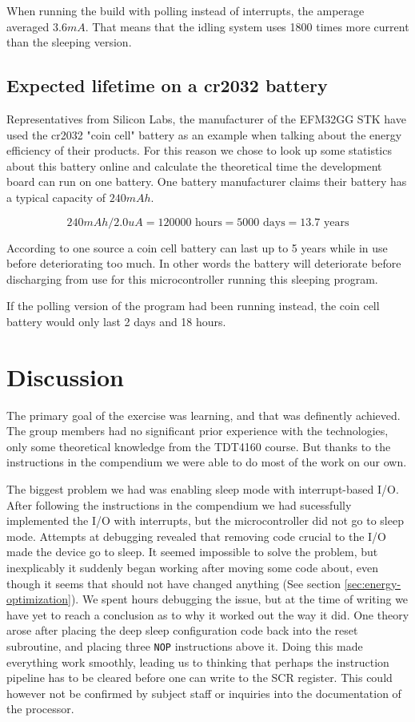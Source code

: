 When running the build with polling instead of interrupts, the amperage averaged $3.6 mA$. That means that the idling system uses 1800 times more current than the sleeping version.

\subsection{Expected lifetime on a cr2032 battery}

Representatives from Silicon Labs, the manufacturer of the EFM32GG STK have used the cr2032 "coin cell" battery as an example when talking about the energy efficiency of their products. For this reason we chose to look up some statistics about this battery online and calculate the theoretical time the development board can run on one battery. One battery manufacturer claims their battery has a typical capacity of $240 mAh$.\cite{cr2032spec}

\[
	240 mAh / 2.0 uA = 120 000 \text{~hours} = 5000 \text{~days} = 13.7 \text{~years}
\]

According to one source \cite{cr2032} a coin cell battery can last up to 5 years while in use before deteriorating too much. In other words the battery will deteriorate before discharging from use for this microcontroller running this sleeping program.

If the polling version of the program had been running instead, the coin cell battery would only last 2 days and 18 hours.

\section{Discussion}
The primary goal of the exercise was learning, and that was definently achieved. The group members had no significant prior experience with the technologies, only some theoretical knowledge from the TDT4160 course. But thanks to the instructions in the compendium we were able to do most of the work on our own.

The biggest problem we had was enabling sleep mode with interrupt-based I/O. After following the instructions in the compendium we had sucessfully implemented the I/O with interrupts, but the microcontroller did not go to sleep mode. Attempts at debugging revealed that removing code crucial to the I/O made the device go to sleep. It seemed impossible to solve the problem, but inexplicably it suddenly began working after moving some code about, even though it seems that should not have changed anything (See section \ref{sec:energy-optimization}). We spent hours debugging the issue, but at the time of writing we have yet to reach a conclusion as to why it worked out the way it did. One theory arose after placing the deep sleep configuration code back into the reset subroutine, and placing three \texttt{NOP} instructions above it. Doing this made everything work smoothly, leading us to thinking that perhaps the instruction pipeline has to be cleared before one can write to the SCR register. This could however not be confirmed by subject staff or inquiries into the documentation of the processor.
